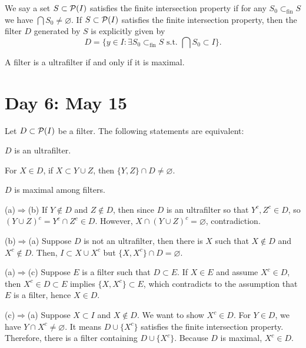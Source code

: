 \documentclass{../../../small}
\begin{document}
\begin{defn*}
We say a set $S\subset\mathcal{P}(I)$ satisfies the finite intersection property if for any $S_0\subset_{\mathrm{fin}}S$ we have $\bigcap S_0\ne\varnothing$.
If $S\subset\mathcal{P}(I)$ satisfies the finite intersection property, then the filter $D$ generated by $S$ is explicitly given by
\[D=\{y\in I:\exists S_0\subset_{\mathrm{fin}}S\text{ s.t.~}\bigcap S_0\subset I\}.\]
\end{defn*}

\begin{lem*}
A filter is a ultrafilter if and only if it is maximal.
\end{lem*}


\newpage
\section{Day 6: May 15}

\begin{thm*}
Let $D\subset\mathcal{P}(I)$ be a filter.
The following statements are equivalent:
\begin{parts}
\item $D$ is an ultrafilter.
\item For $X\in D$, if $X\subset Y\cup Z$, then $\{Y,Z\}\cap D\ne\varnothing$.
\item $D$ is maximal among filters.
\end{parts}
\end{thm*}
\begin{pf}
(a)$\Rightarrow$(b)
If $Y\notin D$ and $Z\notin D$, then since $D$ is an ultrafilter so that $Y^c,Z^c\in D$, so $(Y\cup Z)^c=Y^c\cap Z^c\in D$.
However, $X\cap(Y\cup Z)^c=\varnothing$, contradiction.

(b)$\Rightarrow$(a)
Suppose $D$ is not an ultrafilter, then there is $X$ such that $X\notin D$ and $X^c\notin D$.
Then, $I\subset X\cup X^c$ but $\{X,X^c\}\cap D=\varnothing$.

(a)$\Rightarrow$(c)
Suppose $E$ is a filter such that $D\subset E$.
If $X\in E$ and assume $X^c\in D$, then $X^c\in D\subset E$ implies $\{X,X^c\}\subset E$, which contradicts to the assumption that $E$ is a filter, hence $X\in D$.

(c)$\Rightarrow$(a)
Suppose $X\subset I$ and $X\notin D$.
We want to show $X^c\in D$.
For $Y\in D$, we have $Y\cap X^c\ne\varnothing$.
It means $D\cup\{X^c\}$ satisfies the finite intersection property.
Therefore, there is a filter containing $D\cup\{X^c\}$.
Because $D$ is maximal, $X^c\in D$.
\end{pf}
\end{document}
